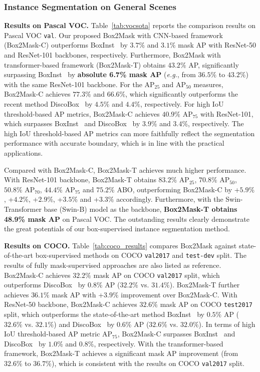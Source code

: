 \documentclass[12pt,onecolumn,letterpaper]{article}
\begin{document}
\subsubsection{Instance Segmentation on General Scenes}

\noindent \textbf{Results on Pascal VOC.}  Table~\ref{tab:vocsota} reports the comparison results on Pascal VOC \texttt{val}. Our proposed Box2Mask with CNN-based framework (Box2Mask-C) outperforms BoxInst~\cite{cvpr2021_boxinst} by $3.7\%$  and $3.1\%$ mask AP with ResNet-50 and ResNet-101 backbones, respectively. 
Furthermore, Box2Mask with transformer-based framework (Box2Mask-T) obtains $43.2\%$ AP, significantly surpassing BoxInst~\cite{cvpr2021_boxinst} by \textbf{absolute 6.7\% mask AP} (\textit{e.g.}, from $36.5\%$ to $43.2\%$) with the same ResNet-101 backbone. 
For the AP$_{25}$ and AP$_{50}$ measures, Box2Mask-C achieves $77.3\%$ and $66.6\%$, which significantly outperforms the recent method DiscoBox~\cite{iccv2021discobox} by $4.5\%$ and $4.4\%$, respectively. 
For high IoU threshold-based AP metrics, Box2Mask-C achieves $40.9\%$ AP$_{75}$ with ResNet-101, which surpasses BoxInst~\cite{cvpr2021_boxinst} and DiscoBox~\cite{iccv2021discobox} by $3.9\%$ and $3.4\%$, respectively. 
The high IoU threshold-based AP metrics can more faithfully reflect the segmentation
performance with accurate boundary, which is in line with the practical applications.

Compared with Box2Mask-C, Box2Mask-T  achieves much higher performance. With ResNet-101 backbone, Box2Mask-T obtains $83.2\%$ AP$_{25}$, $70.8\%$ AP$_{50}$, $50.8\%$ AP$_{70}$,  $44.4\%$ AP$_{75}$ and $75.2\%$ ABO, outperforming Box2Mask-C by +$5.9\%$, +$4.2\%$,  +$2.9\%$, +$3.5\%$ and +$3.3\%$ accordingly.
Furthermore, with the Swin-Transformer base (Swin-B) model as the backbone, \textbf{Box2Mask-T obtains 48.9\% mask AP} on Pascal VOC. 
The outstanding results clearly demonstrate the great potentials of our box-supervised instance segmentation method. 

\textbf{Results on COCO.} 
Table~\ref{tab:coco_results} compares Box2Mask against state-of-the-art box-supervised methods on COCO \texttt{val2017} and \texttt{test-dev} split. The results of fully mask-supervised approaches are also listed as reference. Box2Mask-C achieves $32.2\%$ mask AP on COCO \texttt{val2017} split, which outperforms DiscoBox~\cite{iccv2021discobox} by 0.8\% AP ($32.2\%$ vs. $31.4\%$). Box2Mask-T further achieves $36.1\%$ mask AP with +$3.9\%$ improvement over Box2Mask-C. 
With ResNet-50 backbone, Box2Mask-C achieves $32.6\%$ mask AP on COCO \texttt{test2017} split, which outperforms the state-of-the-art method BoxInst~\cite{cvpr2021_boxinst} by $0.5\%$ AP ($32.6\%$ vs. $32.1\%$) and DiscoBox~\cite{iccv2021discobox} by 0.6\% AP ($32.6\%$ vs. $32.0\%$). In terms of high IoU threshold-based AP metric AP$_{75}$, Box2Mask-C surpasses BoxInst~\cite{cvpr2021_boxinst} and DiscoBox~\cite{iccv2021discobox} by $1.0\%$ and $0.8\%$, respectively. With the transformer-based framework, Box2Mask-T achieves a significant mask AP improvement (from $32.6\%$ to $36.7\%$), which is consistent with the results on COCO \texttt{val2017} split. 
\end{document}
